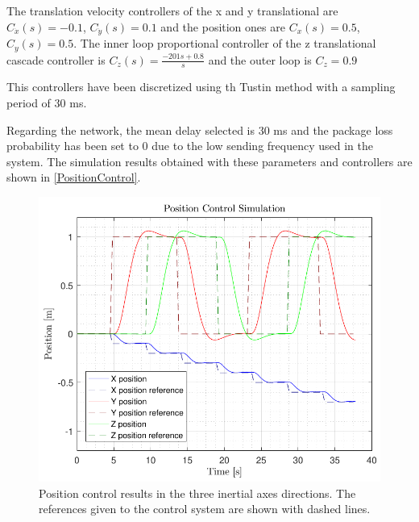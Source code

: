 The translation velocity controllers of the x and y translational are $C_{\dot{x}}(s)= -0.1$, $C_{\dot{y}}(s)= 0.1$ and the position ones are $C_x(s)= 0.5$, $C_y(s)= 0.5$. The inner loop proportional controller of the z translational cascade controller is
$C_{\dot{z}}(s)=\frac{-201s+0.8}{s}$ and the outer loop is $C_z=0.9$

This controllers have been discretized using th Tustin method with a sampling period of 30 ms. 

Regarding the network, the mean delay selected is 30 ms and the package loss probability has been set to 0 due to the low sending frequency used in the system.
The simulation results obtained with these parameters and controllers are shown in \autoref{PositionControl}.
\begin{figure}[H]
	\centering
	\includegraphics[scale=0.35]{figures/PositionControl}
	\caption{Position control results in the three inertial axes directions. The references given to the control system are shown with dashed lines.}
	\label{PositionControl}
\end{figure}

